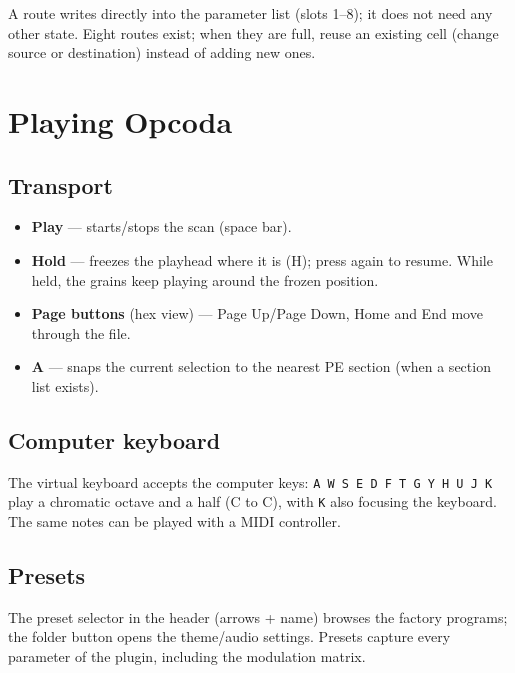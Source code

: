 \documentclass[11pt,a4paper]{article}
\begin{document}
A route writes directly into the parameter list (slots 1--8); it does not need
any other state. Eight routes exist; when they are full, reuse an existing
cell (change source or destination) instead of adding new ones.

\section{Playing Opcoda}
\subsection{Transport}
\begin{itemize}
  \item \textbf{Play} --- starts/stops the scan (space bar).
  \item \textbf{Hold} --- freezes the playhead where it is (H); press again to
  resume. While held, the grains keep playing around the frozen position.
  \item \textbf{Page buttons} (hex view) --- Page Up/Page Down, Home and End
  move through the file.
  \item \textbf{A} --- snaps the current selection to the nearest PE section
  (when a section list exists).
\end{itemize}

\subsection{Computer keyboard}
The virtual keyboard accepts the computer keys:
\texttt{A W S E D F T G Y H U J K} play a chromatic octave and a half
(C to C), with \texttt{K} also focusing the keyboard. The same notes can be
played with a MIDI controller.

\subsection{Presets}
The preset selector in the header (arrows + name) browses the factory
programs; the folder button opens the theme/audio settings. Presets capture
every parameter of the plugin, including the modulation matrix.
\end{document}
